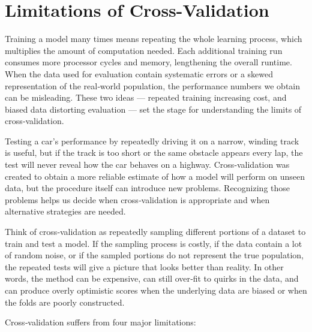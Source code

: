 \documentclass[12pt, a4paper]{article}
\begin{document}
\section{Limitations of Cross-Validation}

Training a model many times means repeating the whole learning process, which multiplies the amount of computation needed. Each additional training run consumes more processor cycles and memory, lengthening the overall runtime. When the data used for evaluation contain systematic errors or a skewed representation of the real‑world population, the performance numbers we obtain can be misleading. These two ideas — repeated training increasing cost, and biased data distorting evaluation — set the stage for understanding the limits of cross‑validation.

Testing a car’s performance by repeatedly driving it on a narrow, winding track is useful, but if the track is too short or the same obstacle appears every lap, the test will never reveal how the car behaves on a highway. Cross‑validation was created to obtain a more reliable estimate of how a model will perform on unseen data, but the procedure itself can introduce new problems. Recognizing those problems helps us decide when cross‑validation is appropriate and when alternative strategies are needed.

Think of cross‑validation as repeatedly sampling different portions of a dataset to train and test a model. If the sampling process is costly, if the data contain a lot of random noise, or if the sampled portions do not represent the true population, the repeated tests will give a picture that looks better than reality. In other words, the method can be expensive, can still over‑fit to quirks in the data, and can produce overly optimistic scores when the underlying data are biased or when the folds are poorly constructed.

Cross‑validation suffers from four major limitations:
\end{document}
